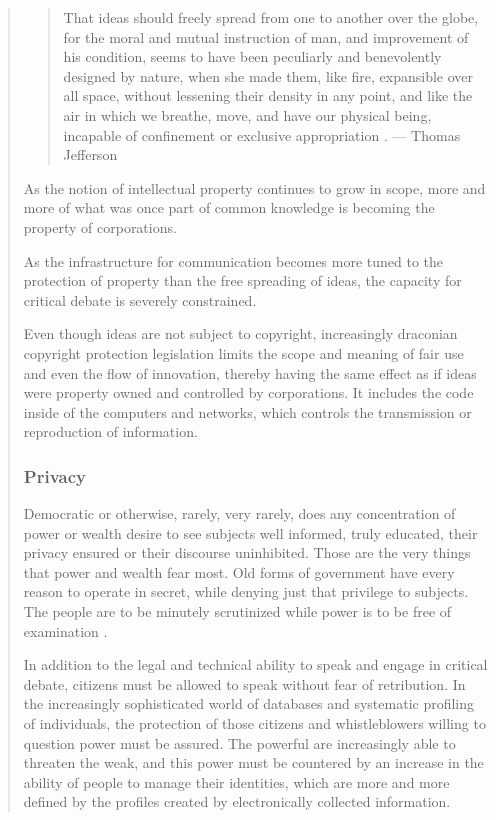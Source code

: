 \begin{quote}
\begin{quotation}
That ideas should freely spread from one to another over the globe, for the moral and mutual instruction of man, and improvement of his condition, seems to have been peculiarly and benevolently designed by nature, when she made them, like fire, expansible over all space, without lessening their density in any point, and like the air in which we breathe, move, and have our physical being, incapable of confinement or exclusive appropriation \cite{jefferson1813letter}.
--- Thomas Jefferson
\end{quotation}

As the notion of intellectual property continues to grow in scope, more and more of what was once part of common knowledge is becoming the property of corporations.

As the infrastructure for communication becomes more tuned to the protection of property than the free spreading of ideas, the capacity for critical debate is severely constrained.

Even though ideas are not subject to copyright, increasingly draconian copyright protection legislation limits the scope and meaning of fair use and even the flow of innovation, thereby having the same effect as if ideas were property owned and controlled by corporations. It includes the code inside of the computers and networks, which controls the transmission or reproduction of information.

\subsubsection{Privacy}

Democratic or otherwise, rarely, very rarely, does any concentration of power or wealth desire to see subjects well informed, truly educated, their privacy ensured or their discourse uninhibited. Those are the very things that power and wealth fear most. Old forms of government have every reason to operate in secret, while denying just that privilege to subjects. The people are to be minutely scrutinized while power is to be free of examination \cite{deehockjoiitoweb}.

In addition to the legal and technical ability to speak and engage in critical debate, citizens must be allowed to speak without fear of retribution. In the increasingly sophisticated world of databases and systematic profiling of individuals, the protection of those citizens and whistleblowers willing to question power must be assured. The powerful are increasingly able to threaten the weak, and this power must be countered by an increase in the ability of people to manage their identities, which are more and more defined by the profiles created by electronically collected information.


\end{quote}
